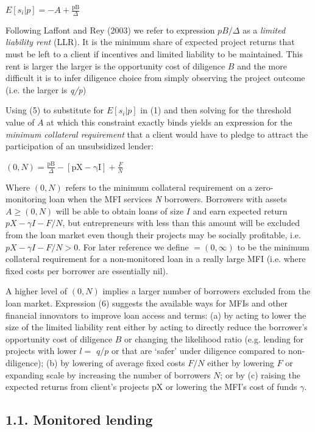 \documentclass[
]{article}
\begin{document}
\(E\left\lbrack s_{i}|p \right\rbrack = - A + \frac{\text{pB}}{\Delta}\)

Following Laffont and Rey (2003) we refer to expression \(pB/\Delta\) as
a \emph{limited liability rent} (LLR). It is the minimum share of
expected project returns that must be left to a client if incentives and
limited liability to be maintained. This rent is larger the larger is
the opportunity cost of diligence \(B\) and the more difficult it is to
infer diligence choice from simply observing the project outcome (i.e.
the larger is \emph{q/p})

Using (5) to substitute for \(E\left\lbrack s_{i}|p \right\rbrack\) in
(1) and then solving for the threshold value of \(A\) at which this
constraint exactly binds yields an expression for the \emph{minimum
collateral requirement} that a client would have to pledge to attract
the participation of an unsubsidized lender:

\((0,N) = \frac{\text{pB}}{\Delta} - \left\lbrack \text{pX} - \text{γI} \right\rbrack + \frac{F}{N}\)

Where \((0,N)\) refers to the minimum collateral requirement on a
zero-monitoring loan when the MFI services \emph{N} borrowers. Borrowers
with assets \(A \geq (0,N)\) will be able to obtain loans of size \(I\)
and earn expected return\(pX - \gamma I - F/N\), but entrepreneurs with
less than this amount will be excluded from the loan market even though
their projects may be socially profitable, i.e.
\(pX - \gamma I - F/N > 0.\) For later reference we define
\(= (0,\infty)\) to be the minimum collateral requirement for a
non-monitored loan in a really large MFI (i.e. where fixed costs per
borrower are essentially nil).

A higher level of \((0,N)\) implies a larger number of borrowers
excluded from the loan market. Expression (6) suggests the available
ways for MFIs and other financial innovators to improve loan access and
terms: (a) by acting to lower the size of the limited liability rent
either by acting to directly reduce the borrower's opportunity cost of
diligence \(B\) or changing the likelihood ratio (e.g. lending for
projects with lower \(l =\) \(q/p\) or that are `safer' under diligence
compared to non-diligence); (b) by lowering of average fixed costs
\(F/N\) either by lowering \(F\) or expanding scale by increasing the
number of borrowers \(N\); or by (c) raising the expected returns from
client's projects \(\text{pX}\) or lowering the MFI's cost of funds
\(\gamma\).

\hypertarget{monitored-lending}{%
\subsection{1.1. Monitored lending}\label{monitored-lending}}
\end{document}
